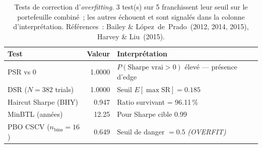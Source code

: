 \begin{table}[H]
\centering
\caption{Tests de correction d'\textit{overfitting}. 3 test(s) sur 5 franchissent leur seuil sur le portefeuille combiné~; les autres échouent et sont signalés dans la colonne d'interprétation. Références~: Bailey \& L\'opez~de~Prado~(2012, 2014, 2015), Harvey \& Liu~(2015).}
\label{tab:robustness_overfitting}
\begin{tabular}{lrl}
\toprule
Test & Valeur & Interprétation \\
\midrule
PSR vs 0 & 1.0000 & $P(\text{Sharpe vrai} > 0)$ élevé --- présence d'edge \\
DSR ($N = 382$ trials) & 1.0000 & Seuil $E[\max\mathrm{SR}] = 0.185$ \\
Haircut Sharpe (BHY) & 0.947 & Ratio survivant = 96.11\,\% \\
MinBTL (années) & 12.25 & Pour Sharpe cible 0.99 \\
PBO CSCV ($n_{\text{bins}} = 16$) & 0.649 & Seuil de danger $= 0.5$ \textit{ (OVERFIT)} \\
\bottomrule
\end{tabular}
\end{table}
